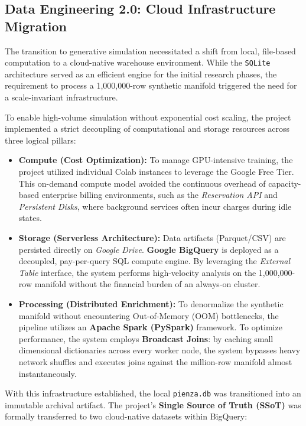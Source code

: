 \subsection{Data Engineering 2.0: Cloud Infrastructure Migration}
The transition to generative simulation necessitated a shift from local, file-based computation to a cloud-native warehouse environment. While the \texttt{SQLite} architecture served as an efficient engine for the initial research phases, the requirement to process a 1,000,000-row synthetic manifold triggered the need for a scale-invariant infrastructure.

To enable high-volume simulation without exponential cost scaling, the project implemented a strict decoupling of computational and storage resources across three logical pillars:

\begin{itemize}[noitemsep, topsep=3pt]
    \item \textbf{Compute (Cost Optimization):} To manage GPU-intensive training, the project utilized individual Colab instances to leverage the Google Free Tier. This on-demand compute model avoided the continuous overhead of capacity-based enterprise billing environments, such as the \textit{Reservation API} and \textit{Persistent Disks}, where background services often incur charges during idle states.
    
    \item \textbf{Storage (Serverless Architecture):} Data artifacts (Parquet/CSV) are persisted directly on \textit{Google Drive}. \textbf{Google BigQuery} is deployed as a decoupled, pay-per-query SQL compute engine. By leveraging the \textit{External Table} interface, the system performs high-velocity analysis on the 1,000,000-row manifold without the financial burden of an always-on cluster.
    
    \item \textbf{Processing (Distributed Enrichment):} To denormalize the synthetic manifold without encountering Out-of-Memory (OOM) bottlenecks, the pipeline utilizes an \textbf{Apache Spark (PySpark)} framework. To optimize performance, the system employs \textbf{Broadcast Joins}: by caching small dimensional dictionaries across every worker node, the system bypasses heavy network shuffles and executes joins against the million-row manifold almost instantaneously.
\end{itemize}

With this infrastructure established, the local \texttt{pienza.db} was transitioned into an immutable archival artifact. The project's \textbf{Single Source of Truth (SSoT)} was formally transferred to two cloud-native datasets within BigQuery:

